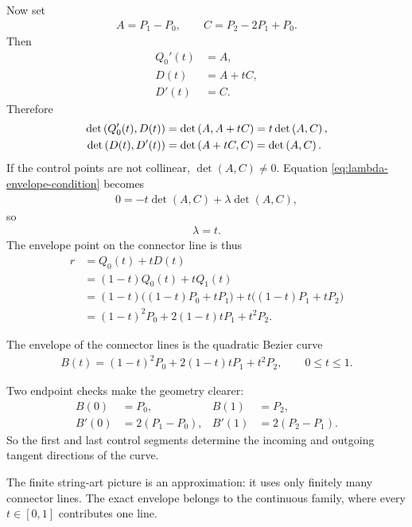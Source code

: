 \documentclass[11pt]{article}
\begin{document}
Now set
\begin{align}
  A=P_1-P_0,\qquad C=P_2-2P_1+P_0.
\end{align}
Then
\begin{align}
  Q_0'(t)&=A,\\
  D(t)&=A+tC,\\
  D'(t)&=C.
\end{align}
Therefore
\begin{align}
  \det\left( Q_0'(t),D(t) \right)
    &=\det\left( A,A+tC \right)
      =t\det\left( A,C \right),\\
  \det\left( D(t),D'(t) \right)
    &=\det\left( A+tC,C \right)
      =\det\left( A,C \right).
\end{align}
If the control points are not collinear, \(\det(A,C)\neq 0\). Equation \cref{eq:lambda-envelope-condition} becomes
\begin{align}
  0=-t\det(A,C)+\lambda\det(A,C),
\end{align}
so
\begin{align}
  \lambda=t.
\end{align}
The envelope point on the connector line is thus
\begin{align}
  r
    &=Q_0(t)+tD(t)\\
    &=(1-t)Q_0(t)+tQ_1(t)\\
    &=(1-t)\bigl((1-t)P_0+tP_1\bigr)
      +t\bigl((1-t)P_1+tP_2\bigr)\\
    &=(1-t)^2P_0+2(1-t)tP_1+t^2P_2.
\end{align}

\begin{resultbox}
The envelope of the connector lines is the quadratic Bezier curve
\begin{align}
  \boxed{
  B(t)=(1-t)^2P_0+2(1-t)tP_1+t^2P_2,
  \qquad 0\leq t\leq 1.
  }
\end{align}
\end{resultbox}

Two endpoint checks make the geometry clearer:
\begin{align}
  B(0)&=P_0,&
  B(1)&=P_2,\\
  B'(0)&=2(P_1-P_0),&
  B'(1)&=2(P_2-P_1).
\end{align}
So the first and last control segments determine the incoming and outgoing tangent directions of the curve.

\begin{checkpointbox}
The finite string-art picture is an approximation: it uses only finitely many connector lines. The exact envelope belongs to the continuous family, where every \(t\in[0,1]\) contributes one line.
\end{checkpointbox}
\end{document}
